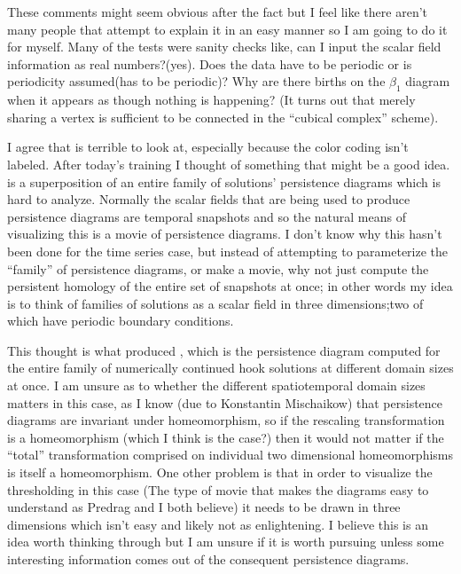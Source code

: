 \begin{description}
{These comments might seem obvious after the fact but I feel like there aren't
many people that attempt to explain it in an easy manner so I am going to do it
for myself. Many of the tests were sanity checks like, can I input the scalar
field information as real numbers?(yes). Does the data have to be periodic or is
periodicity assumed(has to be periodic)? Why are there births on the $\beta_1$
diagram when it appears as though nothing is happening? (It turns out that merely
sharing a vertex is sufficient to be connected in the ``cubical complex''
scheme).

I agree that  is terrible to look at,
especially because the color coding isn't labeled. After today's training I
thought of something that might be a good idea.
 is a superposition of an entire family
of solutions' persistence diagrams which is hard to analyze. Normally the scalar
fields that are being used to produce persistence diagrams are temporal snapshots
and so the natural means of visualizing this is a movie of persistence diagrams.
I don't know why this hasn't been done for the time series case, but instead of
attempting to parameterize the ``family'' of persistence diagrams, or make a
movie, why not just compute the persistent homology of the entire set of
snapshots at once; in other words my idea is to think of families of solutions as
a scalar field in three dimensions;two of which have periodic boundary
conditions.

This thought is what produced , which is the
persistence diagram computed for the entire family of numerically continued hook
solutions at different domain sizes at once. I am unsure as to whether the
different spatiotemporal domain sizes matters in this case, as I know (due to
Konstantin Mischaikow) that persistence diagrams are invariant under
homeomorphism, so if the rescaling transformation is a homeomorphism (which I
think is the case?) then it would not matter if the ``total'' transformation
comprised on individual two dimensional homeomorphisms is itself a homeomorphism.
One other problem is that in order to visualize the thresholding in this case
(The type of movie that makes the diagrams easy to understand as Predrag and I
both believe) it needs to be drawn in three dimensions which isn't easy and
likely not as enlightening. I believe this is an idea worth thinking through but
I am unsure if it is worth pursuing unless some interesting information comes out
of the consequent persistence diagrams.
\\

}
\end{description}
